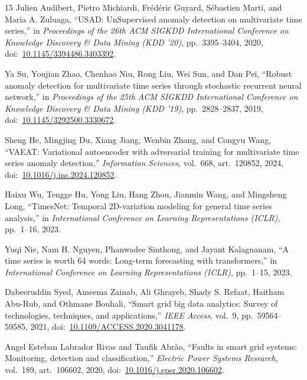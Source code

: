 \documentclass[12pt,a4paper]{report}
\begin{document}
\begin{thebibliography}{15}
Julien Audibert, Pietro Michiardi, Fr\'ed\'eric Guyard, S\'ebastien Marti, and Maria A. Zuluaga, ``USAD: UnSupervised anomaly detection on multivariate time series,'' in \textit{Proceedings of the 26th ACM SIGKDD International Conference on Knowledge Discovery \& Data Mining (KDD '20)}, pp.~3395--3404, 2020, doi:~\href{https://doi.org/10.1145/3394486.3403392}{10.1145/3394486.3403392}.

Ya Su, Youjian Zhao, Chenhao Niu, Rong Liu, Wei Sun, and Dan Pei, ``Robust anomaly detection for multivariate time series through stochastic recurrent neural network,'' in \textit{Proceedings of the 25th ACM SIGKDD International Conference on Knowledge Discovery \& Data Mining (KDD '19)}, pp.~2828--2837, 2019, doi:~\href{https://doi.org/10.1145/3292500.3330672}{10.1145/3292500.3330672}.

Sheng He, Mingjing Du, Xiang Jiang, Wenbin Zhang, and Congyu Wang, ``VAEAT: Variational autoencoder with adversarial training for multivariate time series anomaly detection,'' \textit{Information Sciences}, vol.~668, art.~120852, 2024, doi:~\href{https://doi.org/10.1016/j.ins.2024.120852}{10.1016/j.ins.2024.120852}.

Haixu Wu, Tengge Hu, Yong Liu, Hang Zhou, Jianmin Wang, and Mingsheng Long, ``TimesNet: Temporal 2D-variation modeling for general time series analysis,'' in \textit{International Conference on Learning Representations (ICLR)}, pp.~1--16, 2023.

Yuqi Nie, Nam H. Nguyen, Phanwadee Sinthong, and Jayant Kalagnanam, ``A time series is worth 64 words: Long-term forecasting with transformers,'' in \textit{International Conference on Learning Representations (ICLR)}, pp.~1--15, 2023.

Dabeeruddin Syed, Ameema Zainab, Ali Ghrayeb, Shady S. Refaat, Haitham Abu-Rub, and Othmane Bouhali, ``Smart grid big data analytics: Survey of technologies, techniques, and applications,'' \textit{IEEE Access}, vol.~9, pp.~59564--59585, 2021, doi:~\href{https://doi.org/10.1109/ACCESS.2020.3041178}{10.1109/ACCESS.2020.3041178}.

Angel Esteban Labrador Rivas and Taufik Abr\~{a}o, ``Faults in smart grid systems: Monitoring, detection and classification,'' \textit{Electric Power Systems Research}, vol.~189, art.~106602, 2020, doi:~\href{https://doi.org/10.1016/j.epsr.2020.106602}{10.1016/j.epsr.2020.106602}.


\end{thebibliography}
\end{document}
